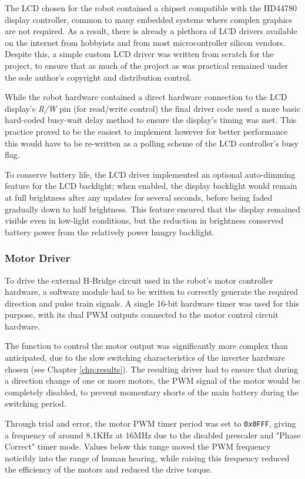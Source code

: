 The LCD chosen for the robot contained a chipset compatible with the HD44780 display controller, common to many embedded systems where complex graphics are not required. As a result, there is already a plethora of LCD drivers available on the internet from hobbyists and from most microcontroller silicon vendors. Despite this, a simple custom LCD driver was written from scratch for the project, to ensure that as much of the project as was practical remained under the sole author's copyright and distribution control.

While the robot hardware contained a direct hardware connection to the LCD display's \textit{R/W} pin (for read/write control) the final driver code used a more basic hard-coded busy-wait delay method to ensure the display's timing was met. This practice proved to be the easiest to implement however for better performance this would have to be re-written as a polling scheme of the LCD controller's busy flag.

To conserve battery life, the LCD driver implemented an optional auto-dimming feature for the LCD backlight; when enabled, the display backlight would remain at full brightness after any updates for several seconds, before being faded gradually down to half brightness. This feature ensured that the display remained visible even in low-light conditions, but the reduction in brightness conserved battery power from the relatively power hungry backlight.

\FloatBarrier
\subsubsection{Motor Driver}

To drive the external H-Bridge circuit used in the robot's motor controller hardware, a software module had to be written to correctly generate the required direction and pulse train signals. A single 16-bit hardware timer was used for this purpose, with its dual PWM outputs connected to the motor control circuit hardware.

The function to control the motor output was significantly more complex than anticipated, due to the slow switching characteristics of the inverter hardware chosen (see Chapter \ref{chp:results}). The resulting driver had to ensure that during a direction change of one or more motors, the PWM signal of the motor would be completely disabled, to prevent momentary shorts of the main battery during the switching period.

Through trial and error, the motor PWM timer period was set to \lstinline{0x0FFF}, giving a frequency of around 8.1KHz at 16MHz due to the disabled prescaler and "Phase Correct" timer mode. Values below this range moved the PWM frequency noticibly into the range of human hearing, while raising this frequency reduced the efficiency of the motors and reduced the drive torque.

